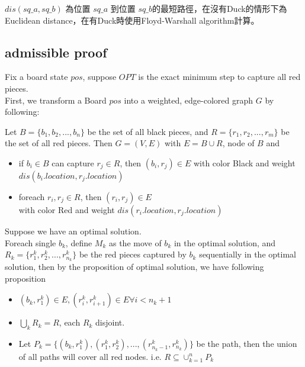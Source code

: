 \documentclass[a4paper, 12pt]{article}  %
\begin{document}
$dis(sq\_a, sq\_b)$ 為位置 $sq\_a$ 到位置 $sq\_b$的最短路徑，在沒有Duck的情形下為Euclidean distance，在有Duck時使用Floyd-Warshall algorithm計算。



\subsection{admissible proof}
Fix a board state $pos$, suppose $OPT$ is the exact minimum step to capture all red pieces.\\
First, we transform a Board $pos$ into a weighted, edge-colored graph $G$ by following:

Let $B = \{b_1,b_2,...,b_n\}$ be the set of all black pieces, 
and $R = \{r_1,r_2,...,r_m\}$ be the  set of all red pieces.
Then $G=(V,E)$ with $E=B\cup R$, node of $B$ and

\begin{itemize}
    \item if $b_i\in B$ can capture $r_j\in R$, then $(b_i, r_j)\in E$ with color Black and weight $dis(b_i.location, r_j.location)$
    \item foreach $r_i,r_j\in R$, then $(r_i, r_j)\in E$\\
            with color Red and weight $dis(r_i.location, r_j.location)$
\end{itemize}


Suppose we have an optimal solution.\\
Foreach single $b_k$, define $M_k$ as the move of $b_k$ in the optimal solution, and $R_k = \{r^k_1, r^k_2,...,r^k_{n_k} \}$ be the red pieces captured by $b_k$ sequentially in the optimal solution, 
then by the proposition of optimal solution, we have following proposition
\begin{itemize}
    \item $(b_k,r^k_1)\in E, (r^k_i, r_{i+1}^k)\in E\forall i<n_k+1$
    \item $\bigcup_k R_k = R$, each $R_k$ disjoint.
    \item Let $P_k=\{(b_k, r^k_1), (r^k_1, r^k_2),...,(r^k_{n_k-1}, r^k_{n_k})\}$ be the path, then the union of all paths will cover all red nodes.
    i.e. $R\subseteq \cup_{k=1}^n P_k$
\end{itemize}

\end{document}
